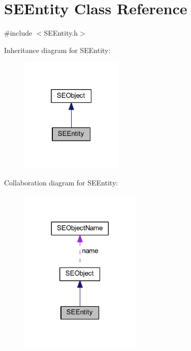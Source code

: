 \section{S\+E\+Entity Class Reference}
\label{class_s_e_entity}


{\ttfamily \#include $<$S\+E\+Entity.\+h$>$}



Inheritance diagram for S\+E\+Entity\+:
\nopagebreak
\begin{figure}[H]
\begin{center}
\leavevmode
\includegraphics[width=139pt]{class_s_e_entity__inherit__graph}
\end{center}
\end{figure}


Collaboration diagram for S\+E\+Entity\+:
\nopagebreak
\begin{figure}[H]
\begin{center}
\leavevmode
\includegraphics[width=164pt]{class_s_e_entity__coll__graph}
\end{center}
\end{figure}
